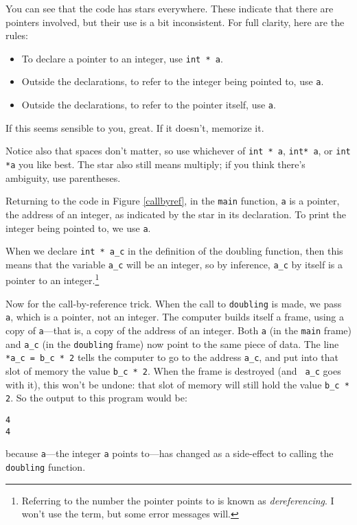 \documentclass[12pt]{article}
\begin{document}

You can see that the code has stars everywhere. These
indicate that there are pointers involved, but their use is a bit inconsistent.
For full clarity, here are the rules:
\begin{itemize}
\item To declare a pointer to an integer, use {\tt int * a}.
\item Outside the declarations, to refer to the integer being pointed to, use {\tt * a}.
\item Outside the declarations, to refer to the pointer itself, use {\tt a}.
\end{itemize}
If this seems sensible to you, great. If it doesn't, memorize it. 

Notice also that spaces don't matter, so use whichever of {\tt int *
a}, {\tt int* a}, or {\tt int *a} you like best. The star also still means multiply; if you think
there's ambiguity, use parentheses.

Returning to the code in Figure \ref{callbyref}, in the {\tt main} function, {\tt a} is a pointer,
the address of an integer, as indicated by the star in its
declaration. To print the integer being pointed to, we use {\tt *a}. 

When we declare {\tt int * a\_c} in the definition of the doubling
function, then this means that the variable {\tt *a\_c} will be an
integer, so by inference, {\tt a\_c} by itself is a pointer to an
integer.\footnote{Referring to the number the pointer points to is
known as {\sl dereferencing}. I won't use the term, but some error
messages will.}

Now for the call-by-reference trick.
When the call to {\tt doubling} is made, we pass {\tt a}, which is a
pointer, not an integer. The computer builds itself a frame, using a copy
of {\tt a}---that is, a copy of the address of an integer. Both {\tt a} (in the {\tt main} frame) 
and {\tt a\_c} (in the {\tt doubling} frame) now point to the same piece of data.
The line {\tt
*a\_c = b\_c * 2} tells the computer to go to the address {\tt a\_c}, and put into that slot of
memory the value {\tt b\_c * 2}. When the frame is destroyed (and {\tt
a\_c} goes with it), this won't be undone: that slot of memory will still
hold the value {\tt b\_c * 2}.  So the output to this program would be:
\begin{verbatim} 
4 
4 
\end{verbatim} 
because {\tt *a}---the integer {\tt a} points to---has changed as a
side-effect to calling the {\tt doubling} function.
\end{document}
